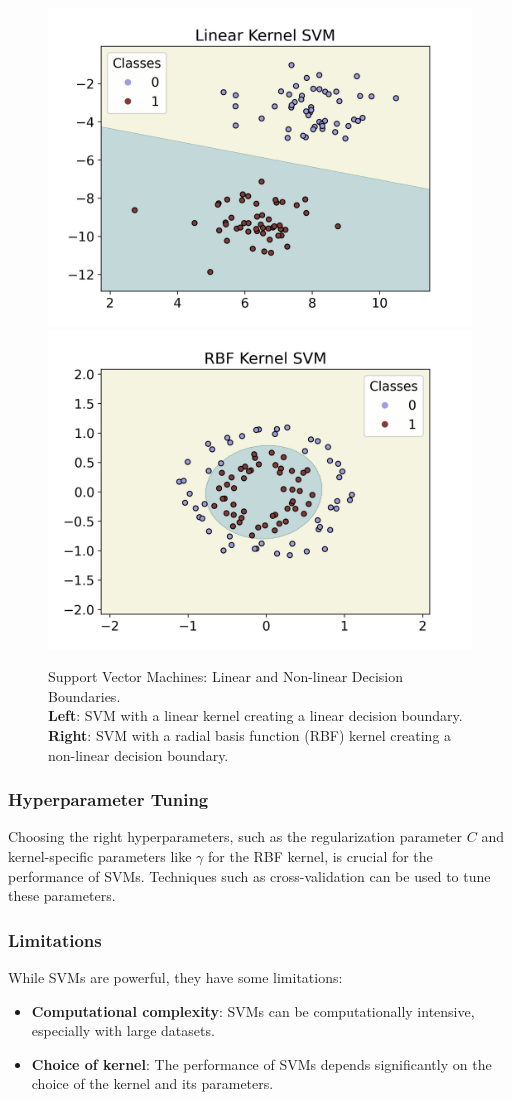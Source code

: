 \documentclass[english,11pt,a4paper,titlepage]{article}
\begin{document}
	\begin{figure}[th]
		\centering
		\includegraphics[width=0.45\linewidth]{img/svm_linear.png}
		\includegraphics[width=0.45\linewidth]{img/svm_nonlinear.png}
		\caption{Support Vector Machines: Linear and Non-linear Decision Boundaries. \\ \textbf{Left}: SVM with a linear kernel creating a linear decision boundary. \textbf{Right}: SVM with a radial basis function (RBF) kernel creating a non-linear decision boundary.}
		\label{fig:svm_examples}
	\end{figure}
	
	\subsubsection*{Hyperparameter Tuning}
	Choosing the right hyperparameters, such as the regularization parameter \( C \) and kernel-specific parameters like \( \gamma \) for the RBF kernel, is crucial for the performance of SVMs. Techniques such as cross-validation can be used to tune these parameters.
	
	\subsubsection*{Limitations}
	While SVMs are powerful, they have some limitations:
	\begin{itemize}
		\item \textbf{Computational complexity}: SVMs can be computationally intensive, especially with large datasets.
		\item \textbf{Choice of kernel}: The performance of SVMs depends significantly on the choice of the kernel and its parameters.
	\end{itemize}
	
\end{document}
